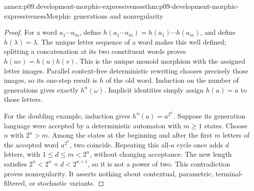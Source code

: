 \begin{annexitem}{annex:p09.development-morphic-expressiveness}{thm:p09-development-morphic-expressiveness}{Morphic generations and nonregularity}
\begin{proof}
For a word \(a_1\cdots a_m\), define
\(h(a_1\cdots a_m)=h(a_1)\cdots h(a_m)\), and define \(h(\lambda)=\lambda\).
The unique letter sequence of a word makes this well defined; splitting
a concatenation at its two constituent words proves
\(h(uv)=h(u)h(v)\). This is the unique monoid morphism with the assigned
letter images. Parallel context-free deterministic rewriting chooses
precisely those images, so its one-step result is \(h\) of the old word.
Induction on the number of generations gives exactly \(h^n(\omega)\).
Implicit identities simply assign \(h(a)=a\) to those letters.

For the doubling example, induction gives \(h^n(a)=a^{2^n}\).
Suppose its generation language were accepted by a deterministic automaton
with \(m\geq1\) states. Choose \(n\) with \(2^n>m\).
Among the states at the beginning and after the first \(m\) letters of
the accepted word \(a^{2^n}\), two coincide. Repeating this all-\(a\)
cycle once adds \(d\) letters, with \(1\leq d\leq m<2^n\), without
changing acceptance. The new length satisfies
\(2^n<2^n+d<2^{n+1}\), so it is not a power of two.
This contradiction proves nonregularity. It asserts nothing about
contextual, parametric, terminal-filtered, or stochastic variants.
\end{proof}
\end{annexitem}

